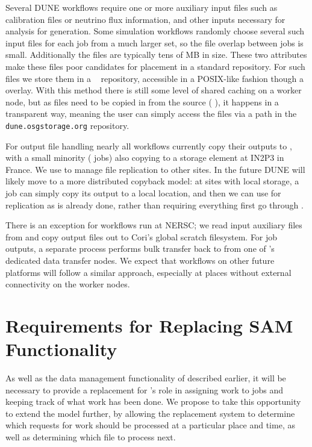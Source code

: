 \documentclass[../main-v1.tex]{subfiles}
\begin{document}
Several DUNE workflows require one or more auxiliary input files %
such as calibration files or neutrino flux information, and other inputs necessary for analysis for  generation. Some simulation workflows randomly
choose several such input files for each job from a much larger set, so the file overlap between jobs is small. Additionally the files are typically tens of MB in size. These two attributes make these files poor candidates for placement in a standard  repository. For such files we store them in a ~\cite{bib:stashcache} repository,
accessible in a POSIX-like fashion though a  overlay. With this method there is still some level of shared caching on a worker node, but as files need to be copied in from the source ( ), it happens in a transparent way, meaning the user can simply access the files via a  path in the {\tt dune.osgstorage.org} repository.

For output file handling nearly all workflows currently copy their outputs to  , with a small minority ( jobs) also copying to a storage element at IN2P3 in France. We use  to manage file replication
to other sites. In the future DUNE will likely move to a more distributed copyback model: at sites with local storage, a job can simply copy its output to a local location, and then we can use  for replication as is already done, rather than requiring everything first go through .

There is an exception for workflows run at NERSC; we read input auxiliary files from and copy output files out
to Cori's global scratch filesystem. For job outputs, a separate process performs bulk transfer back to  from one of 's dedicated data transfer nodes. We expect that workflows on other future  platforms
will follow a similar approach, especially at places without external connectivity on the worker nodes.

\section{Requirements for Replacing SAM Functionality}

As well as the data management functionality of  described earlier, it will be necessary to provide a replacement for 's role in assigning work to jobs and keeping track of what work has been done. We propose to take this opportunity to extend the  model further, by allowing the replacement system to determine which requests for work should be processed at a particular place and time, as well as determining which file to process next.
\end{document}

